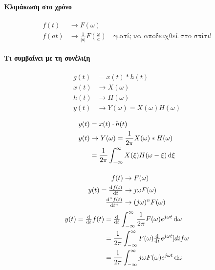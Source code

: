      \paragraph{Κλιμάκωση στο χρόνο}
     \begin{align*}
     f(t) &\to F(\omega )\\
     f(at)&\to \frac{1}{|a|}F\left( \frac{\omega }{a} \right)
     \quad \text{γιατί; να αποδειχθεί στο σπίτι!}
     \end{align*}
     
     \paragraph{Τι συμβαίνει με τη συνέλιξη}
     \begin{align*}
     g(t) &= x(t)*h(t) \\
     x(t)&\to X(\omega )\\
     h(t)&\to H(\omega )\\
     y(t)&\to Y(\omega) = X(\omega)H(\omega)
     \end{align*}
     
     \begin{align*}
     y(t) &= x(t)\cdot h(t)\\
     y(t) &\to Y(\omega) = \frac{1}{2\pi}X(\omega)*H(\omega )
     \\ &= \frac{1}{2\pi} \int_{-\infty}^{\infty} X(\xi)H(\omega-\xi)\dif\xi
     \end{align*}
     
     \paragraph{}
     \begin{align*}
     f(t) &\to F(\omega)\\
     y(t)=\od{f(t)}{t}&\to j\omega F(\omega ) \\
     \od[n]{f(t)}{t}&\to (j\omega )^nF(\omega )
     \end{align*}
     \begin{align*}
     y(t)=\od{}{t}f(t) &= \od{}{t} \int_{-\infty}^{\infty} \frac{1}{2\pi}
     F(\omega ) e^{j\omega t}\dif \omega 
     \\ &= \frac{1}{2\pi}\int_{-\infty}^{\infty} F(\omega )\od{}{t}
     e^{j\omega t}]dif \omega 
     \\ &= \frac{1}{2\pi} \int_{-\infty}^{\infty} j\omega F(\omega )
     e^{j\omega t}\dif \omega 
     \end{align*}
     \subparagraph{}
     

